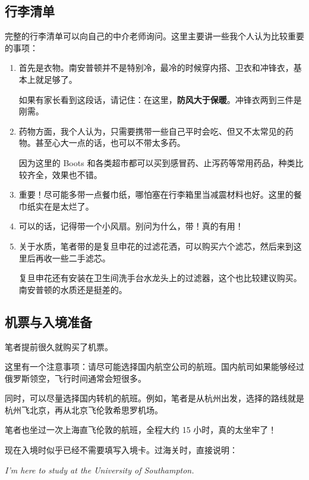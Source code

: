 \documentclass[UTF8,12pt,a4paper]{ctexart}
\begin{document}
\subsection{行李清单}

完整的行李清单可以向自己的中介老师询问。这里主要讲一些我个人认为比较重要的事项：

\begin{enumerate}
    \item 首先是衣物。南安普顿并不是特别冷，最冷的时候穿内搭、卫衣和冲锋衣，基本上就足够了。

    如果有家长看到这段话，请记住：在这里，\textbf{防风大于保暖}。冲锋衣两到三件是刚需。

    \item 药物方面，我个人认为，只需要携带一些自己平时会吃、但又不太常见的药物。甚至心大一点的话，也可以不带太多药。

    因为这里的 Boots 和各类超市都可以买到感冒药、止泻药等常用药品，种类比较齐全，效果也不错。

    \item 重要！尽可能多带一点餐巾纸，哪怕塞在行李箱里当减震材料也好。这里的餐巾纸实在是太烂了。

    \item 可以的话，记得带一个小风扇。别问为什么，带！真的有用！

    \item 关于水质，笔者带的是复旦申花的过滤花洒，可以购买六个滤芯，然后来到这里后再收一些二手滤芯。

    复旦申花还有安装在卫生间洗手台水龙头上的过滤器，这个也比较建议购买。南安普顿的水质还是挺差的。
\end{enumerate}

\subsection{机票与入境准备}

笔者提前很久就购买了机票。

这里有一个注意事项：请尽可能选择国内航空公司的航班。国内航司如果能够经过俄罗斯领空，飞行时间通常会短很多。

同时，可以尽量选择国内转机的航班。例如，笔者是从杭州出发，选择的路线就是杭州飞北京，再从北京飞伦敦希思罗机场。

笔者也坐过一次上海直飞伦敦的航班，全程大约 15 小时，真的太坐牢了！

现在入境时似乎已经不需要填写入境卡。过海关时，直接说明：

\begin{center}
    \textit{I'm here to study at the University of Southampton.}
\end{center}
\end{document}
